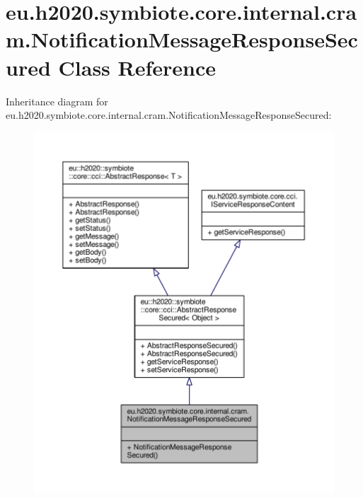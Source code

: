 \hypertarget{classeu_1_1h2020_1_1symbiote_1_1core_1_1internal_1_1cram_1_1NotificationMessageResponseSecured}{}\section{eu.\+h2020.\+symbiote.\+core.\+internal.\+cram.\+Notification\+Message\+Response\+Secured Class Reference}
\label{classeu_1_1h2020_1_1symbiote_1_1core_1_1internal_1_1cram_1_1NotificationMessageResponseSecured}


Inheritance diagram for eu.\+h2020.\+symbiote.\+core.\+internal.\+cram.\+Notification\+Message\+Response\+Secured\+:\nopagebreak
\begin{figure}[H]
\begin{center}
\leavevmode
\includegraphics[width=350pt]{classeu_1_1h2020_1_1symbiote_1_1core_1_1internal_1_1cram_1_1NotificationMessageResponseSecured__inherit__graph}
\end{center}
\end{figure}


